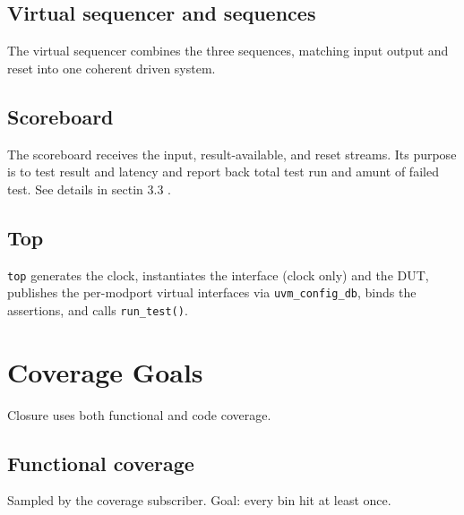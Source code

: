 \documentclass[11pt,a4paper]{article}
\begin{document}
{\subsection*{Virtual sequencer and sequences}
The virtual sequencer combines the three sequences, matching input output and reset into one coherent driven system.


\subsection*{Scoreboard}
The scoreboard receives the input, result-available, and reset streams. Its purpose is to test result and latency and report back total test run and amunt of failed test. See details in sectin 3.3 .



\subsection*{Top}
\texttt{top} generates the clock, instantiates the interface (clock only) and the
DUT, publishes the per-modport virtual interfaces via \texttt{uvm\_config\_db},
binds the assertions, and calls \texttt{run\_test()}.

\section{Coverage Goals}

Closure uses both functional and code coverage.

\subsection*{Functional coverage}
Sampled by the coverage subscriber. Goal: every bin hit at least once.

}
\end{document}
